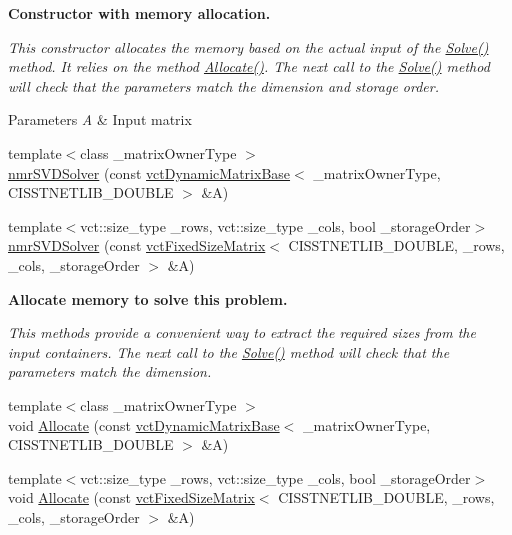 \begin{Indent}{\bf Constructor with memory allocation.}\par
{\em This constructor allocates the memory based on the actual input of the \hyperlink{classnmr_s_v_d_solver_a8f0a70263a6d3970948ca42f8fb6fb65}{Solve()} method. It relies on the method \hyperlink{classnmr_s_v_d_solver_af32d34f0fc16618b2b0658b198d2dd85}{Allocate()}. The next call to the \hyperlink{classnmr_s_v_d_solver_a8f0a70263a6d3970948ca42f8fb6fb65}{Solve()} method will check that the parameters match the dimension and storage order.


\begin{DoxyParams}{Parameters}
{\em A} & Input matrix \\
\hline
\end{DoxyParams}
}\begin{DoxyCompactItemize}
\item 
{\footnotesize template$<$class \+\_\+matrix\+Owner\+Type $>$ }\\\hyperlink{classnmr_s_v_d_solver_a139d37cb485ba179bd704380297b0cef}{nmr\+S\+V\+D\+Solver} (const \hyperlink{classvct_dynamic_matrix_base}{vct\+Dynamic\+Matrix\+Base}$<$ \+\_\+matrix\+Owner\+Type, C\+I\+S\+S\+T\+N\+E\+T\+L\+I\+B\+\_\+\+D\+O\+U\+B\+L\+E $>$ \&A)
\item 
{\footnotesize template$<$vct\+::size\+\_\+type \+\_\+rows, vct\+::size\+\_\+type \+\_\+cols, bool \+\_\+storage\+Order$>$ }\\\hyperlink{classnmr_s_v_d_solver_a9c895fce1bce377745613bfaeaa84853}{nmr\+S\+V\+D\+Solver} (const \hyperlink{classvct_fixed_size_matrix}{vct\+Fixed\+Size\+Matrix}$<$ C\+I\+S\+S\+T\+N\+E\+T\+L\+I\+B\+\_\+\+D\+O\+U\+B\+L\+E, \+\_\+rows, \+\_\+cols, \+\_\+storage\+Order $>$ \&A)
\end{DoxyCompactItemize}
\end{Indent}
\begin{Indent}{\bf Allocate memory to solve this problem.}\par
{\em This methods provide a convenient way to extract the required sizes from the input containers. The next call to the \hyperlink{classnmr_s_v_d_solver_a8f0a70263a6d3970948ca42f8fb6fb65}{Solve()} method will check that the parameters match the dimension. }\begin{DoxyCompactItemize}
\item 
{\footnotesize template$<$class \+\_\+matrix\+Owner\+Type $>$ }\\void \hyperlink{classnmr_s_v_d_solver_a251cfe773b95c7d56ead059cdb9d571f}{Allocate} (const \hyperlink{classvct_dynamic_matrix_base}{vct\+Dynamic\+Matrix\+Base}$<$ \+\_\+matrix\+Owner\+Type, C\+I\+S\+S\+T\+N\+E\+T\+L\+I\+B\+\_\+\+D\+O\+U\+B\+L\+E $>$ \&A)
\item 
{\footnotesize template$<$vct\+::size\+\_\+type \+\_\+rows, vct\+::size\+\_\+type \+\_\+cols, bool \+\_\+storage\+Order$>$ }\\void \hyperlink{classnmr_s_v_d_solver_a895dc04aa64bf8fbe41936453d2a3af9}{Allocate} (const \hyperlink{classvct_fixed_size_matrix}{vct\+Fixed\+Size\+Matrix}$<$ C\+I\+S\+S\+T\+N\+E\+T\+L\+I\+B\+\_\+\+D\+O\+U\+B\+L\+E, \+\_\+rows, \+\_\+cols, \+\_\+storage\+Order $>$ \&A)
\end{DoxyCompactItemize}
\end{Indent}
